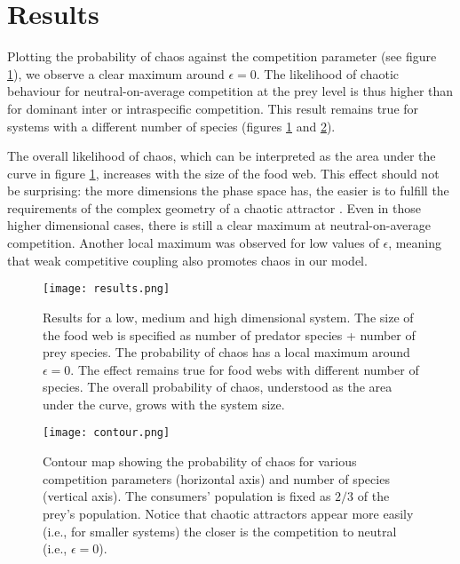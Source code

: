 \section{Results}
\label{sec:Results}
Plotting the probability of chaos against the competition parameter (see figure \ref{fig:Results}), we observe a clear maximum around $ \epsilon = 0 $. The likelihood of chaotic behaviour for neutral-on-average competition at the prey level is thus higher than for dominant inter or intraspecific competition. This result remains true for systems with a different number of species (figures \ref{fig:Results} and \ref{fig:Contour}).

The overall likelihood of chaos, which can be interpreted as the area under the curve in figure \ref{fig:Results}, increases with the size of the food web. This effect should not be surprising: the more dimensions the phase space has, the easier is to fulfill the requirements of the complex geometry of a chaotic attractor \citep{Strogatz1994}. Even in those higher dimensional cases, there is still a clear maximum at neutral-on-average competition. Another local maximum was observed for low values of $ \epsilon $, meaning that weak competitive coupling also promotes chaos in our model.

\begin{figure}
	\begin{center}
		\texttt{[image: results.png]}
	\end{center}
	\caption{Results for a low, medium and high dimensional system. The size of the food web is specified as number of predator species + number of prey species. The probability of chaos has a local maximum around $\epsilon = 0$. The effect remains true for food webs with different number of species. The overall probability of chaos, understood as the area under the curve, grows with the system size. }
	\label{fig:Results}
\end{figure}

\begin{figure}
	\begin{center}
		\texttt{[image: contour.png]}
	\end{center}
	\caption{Contour map showing the probability of chaos for various competition parameters (horizontal axis) and number of species (vertical axis). The consumers' population is fixed as $ 2/3 $ of the prey's population. Notice that chaotic attractors appear more easily (i.e., for smaller systems) the closer is the competition to neutral (i.e., $ \epsilon = 0 $).}
	\label{fig:Contour}
\end{figure}

